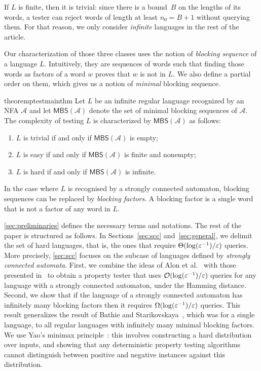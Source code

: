 \documentclass[letterpaper, USenglish, cleveref, autoref, thm-restate, numberwithinsect]{lipics-v2021}
\theoremstyle{theorem}
\theoremstyle{definition}
\newcommand{\Aa}{\mathcal{A}}
\newcommand{\cO}{\mathcal{O}}
\newcommand{\eps}{\varepsilon}
\newcommand{\MBS}{\textsf{MBS}\xspace}
\newcommand{\epslogeps}[1][]
{\ifthenelse{\equal{#1}{}}{\log(\eps^{-1})/\eps}{\log^{ #1 }(\eps^{-1})/\eps}}
\begin{document}
\begin{remark}\label{rmk:finite}
    If $L$ is finite, then it is trivial: since there is a bound~$B$ on the lengths of its words, a tester can reject words of length at least $n_0 = B+1$ without querying them.
    For that reason, we only consider \emph{infinite} languages in the rest of the article.
\end{remark}


Our characterization of those three classes uses the notion of \emph{blocking sequence} of a language $L$. Intuitively, they  are sequences of words such that finding those words as factors of a word $w$ proves that $w$ is not in $L$.
We also define a partial order on them, which gives us a notion of \emph{minimal} blocking sequence.

\begin{restatable}{theorem}{ptestmainthm}\label{thm:general}
	Let $L$ be an infinite regular language recognized by an NFA $\Aa$ and let $\MBS(\Aa)$ denote the set of minimal blocking sequences of $\Aa$.
	The complexity of testing $L$ is characterized by $\MBS(\Aa)$ as follows:
	\begin{enumerate}
		\item $L$ is trivial if and only if $\MBS(\Aa)$ is empty;
		\item $L$ is easy if and only if $\MBS(\Aa)$ is finite and nonempty;
		\item $L$ is hard if and only if $\MBS(\Aa)$ is infinite.
	\end{enumerate}
\end{restatable}
In the case where $L$ is recognised by a strongly connected automaton, blocking sequences can be replaced by \emph{blocking factors}. A blocking factor is a single word that is not a factor of any word in $L$.

\cref{sec:preliminaries} defines the necessary terms and notations.
The rest of the paper is structured as follows.
In Sections~\ref{sec:scc} and~\ref{sec:general}, we delimit the set of hard languages, that is, the ones that require $\Theta(\epslogeps)$ queries.
More precisely, \cref{sec:scc} focuses on the subcase of languages defined by \emph{strongly connected automata}.
First, we combine the ideas of Alon et al.~\cite{alon2001regular} with those presented in~\cite{bathie2021property} to obtain a property tester that uses $\cO(\epslogeps)$ queries for any language with a strongly connected automaton, under the Hamming distance.
Second, we show that if the language of a strongly connected automaton has infinitely many blocking factors then it requires $\Omega(\epslogeps)$ queries.
This result generalizes the result of Bathie and Starikovskaya~\cite{bathie2021property}, which was for a single language, to all regular languages with infinitely many minimal blocking factors. We use Yao's minimax principle~\cite{yao1977probabilistic}: this involves constructing a hard distribution over inputs, and showing that any deterministic property testing algorithms cannot distinguish between positive and negative instances against this distribution.
\end{document}
